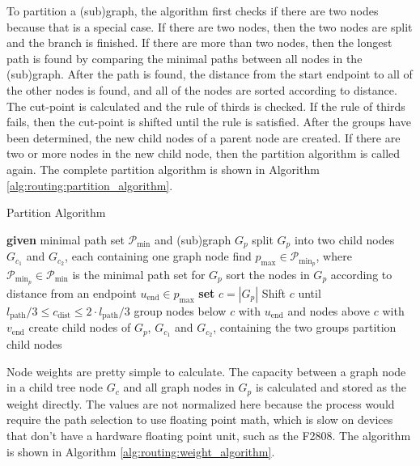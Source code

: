 To partition a (sub)graph, the algorithm first checks if there are two nodes because that is a special case. If there are two nodes, then the two nodes are split and the branch is finished. If there are more than two nodes, then the longest path is found by comparing the minimal paths between all nodes in the (sub)graph. After the path is found, the distance from the start endpoint to all of the other nodes is found, and all of the nodes are sorted according to distance. The cut-point is calculated and the rule of thirds is checked. If the rule of thirds fails, then the cut-point is shifted until the rule is satisfied. After the groups have been determined, the new child nodes of a parent node are created. If there are two or more nodes in the new child node, then the partition algorithm is called again. The complete partition algorithm is shown in Algorithm \ref{alg:routing:partition_algorithm}.
\begin{algorithm}
	\caption{Partition Algorithm}
	\begin{algorithmic}[1]
		\STATE \textbf{given} minimal path set $\mathscr{P}_{\textrm{min}} $  and (sub)graph $G_p$
			\STATE split $G_p$ into two child nodes $G_{c_1}$ and $G_{c_2}$, each containing one graph node
		\ELSE
			\STATE find $p_{\textrm{max}}\in \mathscr{P}_{\textrm{min}_p} $, where $\mathscr{P}_{\textrm{min}_p}\in \mathscr{P}_\textrm{min} $ is the minimal path set for $G_p$
			\STATE sort the nodes in $G_p$ according to distance from an endpoint $u_\textrm{end}\in p_{\textrm{max}} $
			\STATE \textbf{set} $c=\left| G_p\right| $
				\STATE Shift $c$ until $l_\textrm{path}/3 \leq c_\textrm{dist} \leq 2\cdot l_\textrm{path}/3 $
			\ENDIF
			\STATE group nodes below $c$ with $u_\textrm{end} $ and nodes above $c$ with $v_\textrm{end} $
			\STATE create child nodes of $G_p$, $G_{c_1}$ and $G_{c_2}$, containing the two groups
       \STATE partition child nodes
			\ENDIF
		\ENDIF
	\end{algorithmic}
	\label{alg:routing:partition_algorithm}
\end{algorithm}

Node weights are pretty simple to calculate. The capacity between a graph node in a child tree node $G_c$ and all graph nodes in $G_p$ is calculated and stored as the weight directly. The values are not normalized here because the process would require the path selection to use floating point math, which is slow on devices that don't have a hardware floating point unit, such as the F2808. The algorithm is shown in Algorithm \ref{alg:routing:weight_algorithm}.


